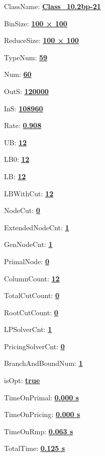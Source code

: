 \documentclass[11pt]{article}
\begin{document}
\pagestyle{empty}


ClassName: \underline{\textbf{Class_10.2bp-21}}
\par
BinSize: \underline{\textbf{100 × 100}}
\par
ReduceSize: \underline{\textbf{100 × 100}}
\par
TypeNum: \underline{\textbf{59}}
\par
Num: \underline{\textbf{60}}
\par
OutS: \underline{\textbf{120000}}
\par
InS: \underline{\textbf{108960}}
\par
Rate: \underline{\textbf{0.908}}
\par
UB: \underline{\textbf{12}}
\par
LB0: \underline{\textbf{12}}
\par
LB: \underline{\textbf{12}}
\par
LBWithCut: \underline{\textbf{12}}
\par
NodeCut: \underline{\textbf{0}}
\par
ExtendedNodeCnt: \underline{\textbf{1}}
\par
GenNodeCnt: \underline{\textbf{1}}
\par
PrimalNode: \underline{\textbf{0}}
\par
ColumnCount: \underline{\textbf{12}}
\par
TotalCutCount: \underline{\textbf{0}}
\par
RootCutCount: \underline{\textbf{0}}
\par
LPSolverCnt: \underline{\textbf{1}}
\par
PricingSolverCnt: \underline{\textbf{0}}
\par
BranchAndBoundNum: \underline{\textbf{1}}
\par
isOpt: \underline{\textbf{true}}
\par
TimeOnPrimal: \underline{\textbf{0.000 s}}
\par
TimeOnPricing: \underline{\textbf{0.000 s}}
\par
TimeOnRmp: \underline{\textbf{0.063 s}}
\par
TotalTime: \underline{\textbf{0.125 s}}
\par
\newpage


\end{document}

